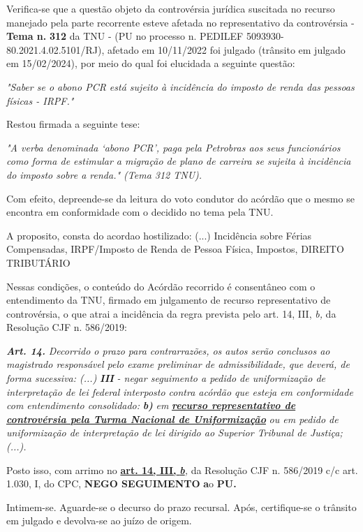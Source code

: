 \documentclass[12pt]{article}
\begin{document}
\justifying
\noindent Verifica-se que a questão objeto da controvérsia jurídica suscitada no recurso manejado pela parte recorrente esteve afetada no representativo da controvérsia - \textbf{Tema n. }\textbf{312} da TNU - (PU no processo n. PEDILEF 5093930-80.2021.4.02.5101/RJ),  afetado em 10/11/2022 foi julgado (trânsito em julgado em 15/02/2024), por meio do qual foi elucidada a seguinte questão:

\noindent \textit{"Saber se o abono PCR está sujeito à incidência do imposto de renda das pessoas físicas - IRPF."}

\noindent Restou firmada a seguinte tese:

\noindent \textit{"A verba denominada ‘abono PCR’, paga pela Petrobras aos seus funcionários como forma de estimular a migração de plano de carreira se sujeita à incidência do imposto sobre a renda." (Tema 312 TNU).}

\noindent Com efeito, depreende-se da leitura do voto condutor do acórdão que o mesmo se encontra em conformidade com o decidido no  tema pela TNU.

\noindent A proposito, consta do acordao hostilizado: (...) Incidência sobre Férias Compensadas, IRPF/Imposto de Renda de Pessoa Física, Impostos, DIREITO TRIBUTÁRIO

\noindent Nessas condições, o conteúdo do Acórdão recorrido é consentâneo com o entendimento da TNU, firmado em julgamento de recurso representativo de controvérsia, o que atrai a incidência da regra prevista pelo art. 14, III, \textit{b,} da Resolução CJF n. 586/2019:

\noindent \textit{\textbf{Art. 14.}}\textit{ Decorrido o prazo para contrarrazões, os autos serão conclusos ao magistrado responsável pelo exame preliminar de admissibilidade, que deverá, de forma sucessiva: (...) }\textit{\textbf{III }}\textit{- negar seguimento a pedido de uniformização de interpretação de lei federal interposto contra acórdão que esteja em conformidade com entendimento consolidado: }\textit{\textbf{b)}}\textit{ em }\uline{\textit{\textbf{recurso representativo de controvérsia pela Turma Nacional de Uniformização}}}\textit{ ou em pedido de uniformização de interpretação de lei dirigido ao Superior Tribunal de Justiça;(...).}

\noindent Posto isso, com arrimo no \uline{\textbf{art. 14, III, }}\uline{\textit{\textbf{b}}}\textit{,} da Resolução CJF n. 586/2019 c/c art. 1.030, I, do CPC, \textbf{NEGO SEGUIMENTO }\textbf{a}o\textbf{ PU}\textbf{.}

\noindent Intimem-se. Aguarde-se o decurso do prazo recursal. Após, certifique-se o trânsito em julgado e devolva-se ao juízo de origem.
\end{document}
